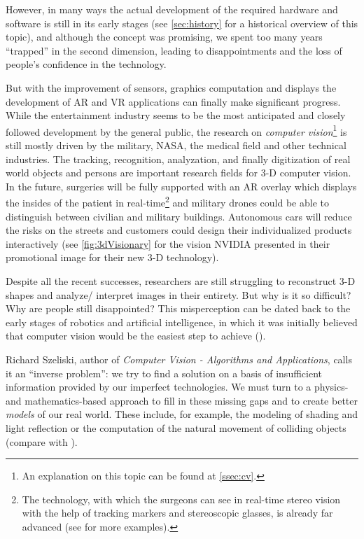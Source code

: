 However, in many ways the actual development of the required hardware and software is still in its early stages (see \autoref{sec:history} for a historical overview of this topic), and although the concept was promising, we spent too many years \enquote{trapped} in the second dimension, leading to disappointments and the loss of people's confidence in the technology.

But with the improvement of sensors, graphics computation and displays the development of AR and VR applications can finally make significant progress. While the entertainment industry seems to be the most anticipated and closely followed development by the general public, the research on \textit{computer vision}\footnote{An explanation on this topic can be found at \autoref{ssec:cv}.} is still mostly driven by the military, NASA, the medical field and other technical industries. The tracking, recognition, analyzation, and finally digitization of real world objects and persons are important research fields for 3-D computer vision. In the future, surgeries will be fully supported with an AR overlay which displays the insides of the patient in real-time\footnote{The technology, with which the surgeons can see in real-time stereo vision with the help of tracking markers and stereoscopic glasses, is already far advanced (see \cite{Lowe.2016} for more examples).} and military drones could be able to distinguish between civilian and military buildings. Autonomous cars will reduce the risks on the streets and customers could design their individualized products interactively (see \autoref{fig:3dVisionary} for the vision NVIDIA presented in their promotional image for their new 3-D technology).

Despite all the recent successes, researchers are still struggling to reconstruct 3-D shapes and analyze/ interpret images in their entirety. But why is it so difficult? Why are people still disappointed? This misperception can be dated back to the early stages of robotics and artificial intelligence, in which it was initially believed that computer vision would be the easiest step to achieve (\cite[p.5]{Szeliski.2011}). 

Richard Szeliski, author of \textit{Computer Vision - Algorithms and Applications}, calls it an \enquote{inverse problem}: we try to find a solution on a basis of insufficient information provided by our imperfect technologies. We must turn to a physics- and mathematics-based approach to fill in these missing gaps and to create better \textit{models} of our real world. These include, for example, the modeling of shading and light reflection or the computation of the natural movement of colliding objects (compare with \cite[p.3 et seqq.]{Szeliski.2011}).  

